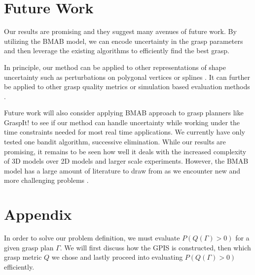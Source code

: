 \documentclass[letterpaper, 10 pt, conference]{ieeeconf}  %
\begin{document}
\section{Future Work}
Our results are promising and they suggest many avenues of future work. By utilizing the BMAB model, we can encode uncertainty in the grasp parameters and then leverage the existing algorithms to efficiently find the best grasp. 

In principle, our method can be applied to other representations of shape uncertainty such as perturbations on polygonal vertices \cite{kehoe2012estimating} or splines \cite{christopoulos2007handling}.
It can further be applied to other grasp quality metrics or simulation based evaluation methods \cite{73}. 

Future work will also consider applying BMAB approach to grasp planners like GraspIt! \cite{miller2004graspit} to see if our method can handle uncertainty while working under the time constraints needed for most real time applications. We currently have only tested one bandit algorithm, successive elimination. While our results are promising, it remains to be seen how well it deals with the increased complexity of 3D models over 2D models and larger scale experiments. However, the BMAB model has a large amount of literature to draw from as we encounter new and more challenging problems \cite{bergemann2006bandit}.





\section{Appendix} \label{sec:Appendix}
 In order to solve our problem definition, we must evaluate $P(Q(\Gamma)>0)$ for a given grasp plan $\Gamma$. We will first discuss how the GPIS is constructed, then which grasp metric $Q$ we chose and lastly proceed into evaluating $P(Q(\Gamma)>0)$ efficiently. 
\end{document}

